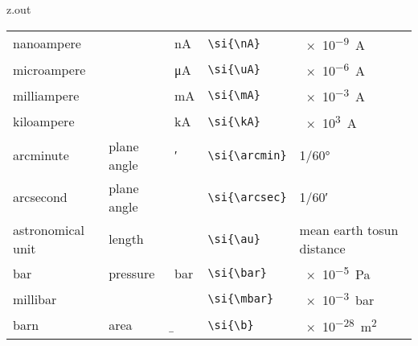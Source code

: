 \begin{VerbatimOut}{z.out}
{\begin{longtable}{@{}P{1.4in}P{1in}llP{1.8in}@{}}
    \quad nanoampere&
      \ditto&
      \si{\nA}&
      \verb+\si{\nA}+&
      \SI{e-9}{\A}\\
    \quad microampere&
      \ditto&
      \si{\uA}&
      \verb+\si{\uA}+&
      \SI{e-6}{\A}\\
    \quad milliampere&
      \ditto&
      \si{\mA}&
      \verb+\si{\mA}+&
      \SI{e-3}{\A}\\
    \quad kiloampere&
      \ditto&
      \si{\kA}&
      \verb+\si{\kA}+&
      \SI{e3}{\A}\\
    \vsp
    \vsp
    arcminute&
      plane angle&
      \si{\arcmin}&
      \verb+\si{\arcmin}+&
      1/60\unit{\degree\nounit}\\
    arcsecond&
      plane angle&
      \si{\arcsec}&
      \verb+\si{\arcsec}+&
      1/60\unit{\arcmin\nounit}\\
    \vsp
    astronomical unit&
      length&
      \si{\au}&
      \verb+\si{\au}+&
      mean earth to\newline sun distance\\
    \vsp
    bar&
      pressure&
      \si{\bar}&
      \verb+\si{\bar}+&
      \SI{e-5}{\Pa}\\
    \quad millibar&
      \ditto&
      \si{\mbar}&
      \verb+\si{\mbar}+&
      \SI{e-3}{\bar}\\
    \vsp
    barn&
      area&
      \si{\b}&
      \verb+\si{\b}+&
      \SI{e-28}{\m\squared}\\

\end{longtable}}
\end{VerbatimOut}
